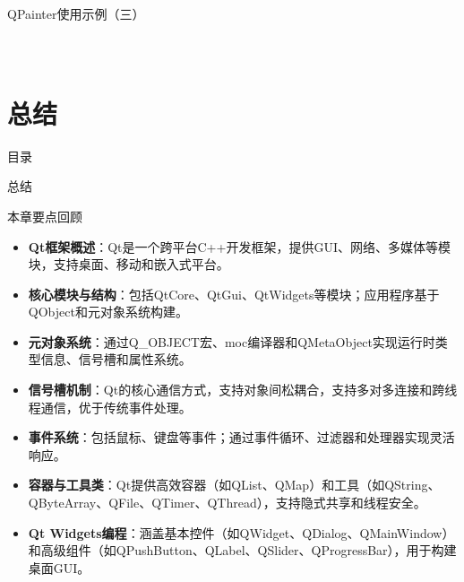 \documentclass[UTF8,aspectratio=169]{beamer}
\begin{document}
\begin{frame}[fragile]{QPainter使用示例（三）}
    \begin{columns}
        \begin{column}{0.48\textwidth}
            \inputminted[firstline=72,lastline=87]{cpp}{code/qt_painter_example.cpp}
        \end{column}
        \begin{column}{0.48\textwidth}
            \inputminted[firstline=88,lastline=96]{cpp}{code/qt_painter_example.cpp}
        \end{column}
    \end{columns}
\end{frame}


\section{总结}
\begin{frame}{目录}
    \begin{multicols}{2}
        \tableofcontents[currentsection]
    \end{multicols}
\end{frame}

\begin{frame}{总结}
    \begin{ytublock}{本章要点回顾}
        \begin{itemize}
            \item \textbf{Qt框架概述}：Qt是一个跨平台C++开发框架，提供GUI、网络、多媒体等模块，支持桌面、移动和嵌入式平台。
            \item \textbf{核心模块与结构}：包括QtCore、QtGui、QtWidgets等模块；应用程序基于QObject和元对象系统构建。
            \item \textbf{元对象系统}：通过Q\_OBJECT宏、moc编译器和QMetaObject实现运行时类型信息、信号槽和属性系统。
            \item \textbf{信号槽机制}：Qt的核心通信方式，支持对象间松耦合，支持多对多连接和跨线程通信，优于传统事件处理。
            \item \textbf{事件系统}：包括鼠标、键盘等事件；通过事件循环、过滤器和处理器实现灵活响应。
            \item \textbf{容器与工具类}：Qt提供高效容器（如QList、QMap）和工具（如QString、QByteArray、QFile、QTimer、QThread），支持隐式共享和线程安全。
            \item \textbf{Qt Widgets编程}：涵盖基本控件（如QWidget、QDialog、QMainWindow）和高级组件（如QPushButton、QLabel、QSlider、QProgressBar），用于构建桌面GUI。
        \end{itemize}
    \end{ytublock}
\end{frame}
\end{document}
